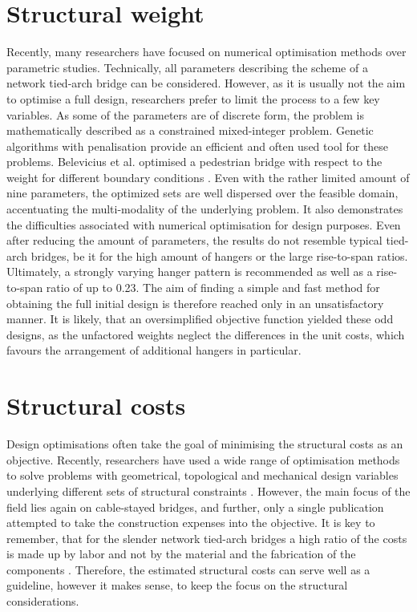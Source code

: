 \section{Structural weight} \label{sec:rev_weight}
Recently, many researchers have focused on numerical optimisation methods over parametric studies. Technically, all parameters describing the scheme of a network tied-arch bridge can be considered. However, as it is usually not the aim to optimise a full design, researchers prefer to limit the process to a few key variables. As some of the parameters are of discrete form, the problem is mathematically described as a constrained mixed-integer problem. Genetic algorithms with penalisation provide an efficient and often used tool for these problems. Belevicius et al. optimised a pedestrian bridge with respect to the weight for different boundary conditions \cite{Belevicius}. Even with the rather limited amount of nine parameters, the optimized sets are well dispersed over the feasible domain, accentuating the multi-modality of the underlying problem.
It also demonstrates the difficulties associated with numerical optimisation for design purposes. Even after reducing the amount of parameters, the results do not resemble typical tied-arch bridges, be it for the high amount of hangers or the large rise-to-span ratios. Ultimately, a strongly varying hanger pattern is recommended as well as a rise-to-span ratio of up to 0.23. The aim of finding a simple and fast method for obtaining the full initial design is therefore reached only in an unsatisfactory manner.
It is likely, that an oversimplified objective function yielded these odd designs, as the unfactored weights neglect the differences in the unit costs, which favours the arrangement of additional hangers in particular.

\section{Structural costs}
Design optimisations often take the goal of minimising the structural costs as an objective. Recently, researchers have used a wide range of optimisation methods to solve problems with geometrical, topological and mechanical design variables underlying different sets of structural constraints \cite{MARTINS}. However, the main focus of the field lies again on cable-stayed bridges, and further, only a single publication attempted to take the construction expenses into the objective. It is key to remember, that for the slender network tied-arch bridges a high ratio of the costs is made up by labor and not by the material and the fabrication of the components \cite{Tveit2}. Therefore, the estimated structural costs can serve well as a guideline, however it makes sense, to keep the focus on the structural considerations.

